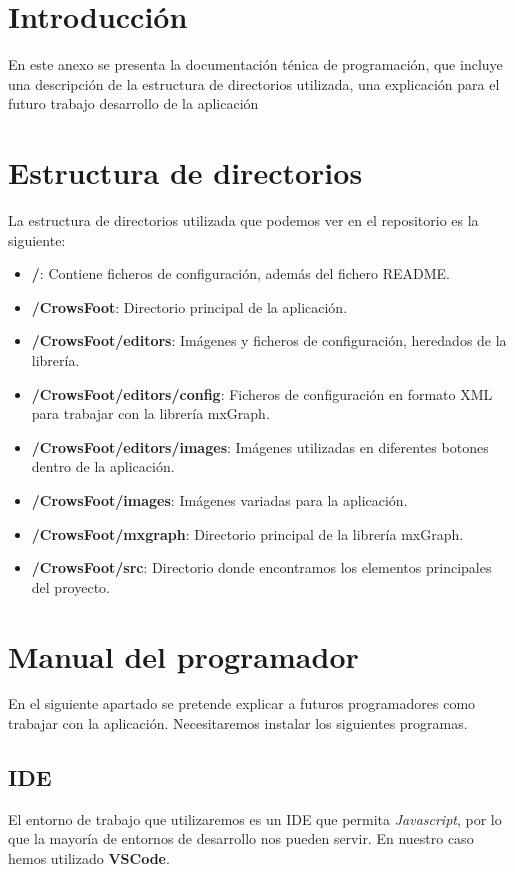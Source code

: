 
\section{Introducción}
En este anexo se presenta la documentación ténica de programación, que incluye una descripción de la estructura de directorios utilizada, una explicación para el futuro trabajo desarrollo de la aplicación

\section{Estructura de directorios}
La estructura de directorios utilizada que podemos ver en el repositorio es la siguiente:
\begin{itemize}
    \item \textbf{/}: Contiene ficheros de configuración, además del fichero README.
    \item \textbf{/CrowsFoot}: Directorio principal de la aplicación.
    \item \textbf{/CrowsFoot/editors}: Imágenes y ficheros de configuración, heredados de la librería.
    \item \textbf{/CrowsFoot/editors/config}: Ficheros de configuración en formato XML para trabajar con la librería mxGraph.
    \item \textbf{/CrowsFoot/editors/images}: Imágenes utilizadas en diferentes botones dentro de la aplicación.
    \item \textbf{/CrowsFoot/images}: Imágenes variadas para la aplicación.
    \item \textbf{/CrowsFoot/mxgraph}: Directorio principal de la librería mxGraph.
    \item \textbf{/CrowsFoot/src}: Directorio donde encontramos los elementos principales del proyecto.
\end{itemize}

\section{Manual del programador}
En el siguiente apartado se pretende explicar a futuros programadores como trabajar con la aplicación. Necesitaremos instalar los siguientes programas.

\subsection{IDE}
El entorno de trabajo que utilizaremos es un IDE que permita \emph{Javascript}, por lo que la mayoría de entornos de desarrollo nos pueden servir. En nuestro caso hemos utilizado \textbf{VSCode}.

